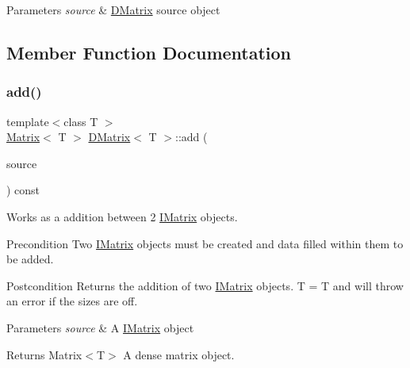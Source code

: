 \begin{DoxyParams}{Parameters}
{\em source} & \mbox{\hyperlink{class_d_matrix}{D\+Matrix}} source object \\
\hline
\end{DoxyParams}


\subsection{Member Function Documentation}
\mbox{\label{class_d_matrix_a8b296d73c991f28ca2af94d36cc006c9}} 
\subsubsection{\texorpdfstring{add()}{add()}\hspace{0.1cm}{\footnotesize\ttfamily [1/6]}}
{\footnotesize\ttfamily template$<$class T $>$ \\
\mbox{\hyperlink{class_matrix}{Matrix}}$<$ T $>$ \mbox{\hyperlink{class_d_matrix}{D\+Matrix}}$<$ T $>$\+::add (\begin{DoxyParamCaption}\item[{const \mbox{\hyperlink{class_i_matrix}{I\+Matrix}}$<$ \mbox{\hyperlink{class_matrix}{Matrix}}$<$ T $>$, T $>$ \&}]{source }\end{DoxyParamCaption}) const}



Works as a addition between 2 \mbox{\hyperlink{class_i_matrix}{I\+Matrix}} objects. 

\begin{DoxyPrecond}{Precondition}
Two \mbox{\hyperlink{class_i_matrix}{I\+Matrix}} objects must be created and data filled within them to be added. 
\end{DoxyPrecond}
\begin{DoxyPostcond}{Postcondition}
Returns the addition of two \mbox{\hyperlink{class_i_matrix}{I\+Matrix}} objects. T = T and will throw an error if the sizes are off.
\end{DoxyPostcond}

\begin{DoxyParams}{Parameters}
{\em source} & A \mbox{\hyperlink{class_i_matrix}{I\+Matrix}} object \\
\hline
\end{DoxyParams}
\begin{DoxyReturn}{Returns}
Matrix$<$\+T$>$ A dense matrix object. 
\end{DoxyReturn}
\mbox{\label{class_d_matrix_ab4b552272ab2e8602b99bccd68702626}} 

